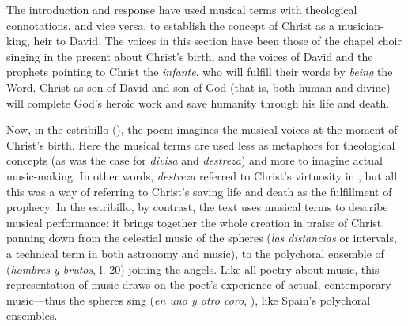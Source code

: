The introduction and response have used musical terms with theological
connotations, and vice versa, to establish the concept of Christ as a
musician-king, heir to David.
The voices in this section have been those of the chapel choir singing in the
present about Christ's birth, and the voices of David and the prophets pointing
to Christ the \emph{infante}, who will fulfill their words by \emph{being} the
Word.
Christ as son of David and son of God (that is, both human and divine) will
complete God's heroic work and save humanity through his life and death.

Now, in the estribillo (), the poem imagines the musical
voices at the moment of Christ's birth.
Here the musical terms are used less as metaphors for theological concepts (as
was the case for \emph{divisa} and \emph{destreza}) and more to imagine actual
music-making.
In other words, \emph{destreza} referred to Christ's virtuosity in
, but all this was a way of
referring to Christ's saving life and death as the fulfillment of prophecy.
In the estribillo, by contrast, the text uses musical terms to describe musical
performance: it brings together the whole creation in praise of Christ, panning
down from the celestial music of the spheres (\emph{las distancias} or
intervals, a technical term in both astronomy and music), to the polychoral
ensemble of  (\emph{hombres y brutos}, l. 20) joining the
angels.
Like all poetry about music, this representation of music draws on the poet's
experience of actual, contemporary music---thus the spheres sing  (\emph{en uno y otro coro}, ), like Spain's
polychoral ensembles.

